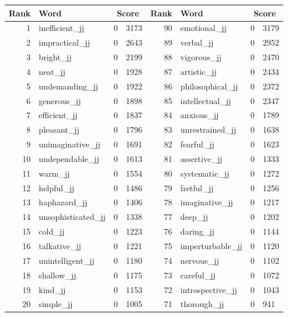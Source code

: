 \begin{table}[tbp]
    \begin{tabular}{| rlr@{.}l | rlr@{.}l |}
    \hline
    \textbf{Rank} & \textbf{Word} & \multicolumn{2}{c|}{\textbf{Score}} & \textbf{Rank} & \textbf{Word} & \multicolumn{2}{c|}{\textbf{Score}} \\
    \hline
    1 & inefficient\_jj & 0 & 3173    &    90 & emotional\_jj & 0 & 3179 \\
    2 & impractical\_jj & 0 & 2643    &    89 & verbal\_jj & 0 & 2952 \\
    3 & bright\_jj & 0 & 2199    &    88 & vigorous\_jj & 0 & 2470 \\
    4 & neat\_jj & 0 & 1928    &    87 & artistic\_jj & 0 & 2434 \\
    5 & undemanding\_jj & 0 & 1922    &    86 & philosophical\_jj & 0 & 2372 \\
    6 & generous\_jj & 0 & 1898    &    85 & intellectual\_jj & 0 & 2347 \\
    7 & efficient\_jj & 0 & 1837    &    84 & anxious\_jj & 0 & 1789 \\
    8 & pleasant\_jj & 0 & 1796    &    83 & unrestrained\_jj & 0 & 1638 \\
    9 & unimaginative\_jj & 0 & 1691    &    82 & fearful\_jj & 0 & 1623 \\
    10 & undependable\_jj & 0 & 1613    &    81 & assertive\_jj & 0 & 1333 \\
    11 & warm\_jj & 0 & 1554    &    80 & systematic\_jj & 0 & 1272 \\
    12 & helpful\_jj & 0 & 1486    &    79 & fretful\_jj & 0 & 1256 \\
    13 & haphazard\_jj & 0 & 1406    &    78 & imaginative\_jj & 0 & 1217 \\
    14 & unsophisticated\_jj & 0 & 1338    &    77 & deep\_jj & 0 & 1202 \\
    15 & cold\_jj & 0 & 1223    &    76 & daring\_jj & 0 & 1144 \\
    16 & talkative\_jj & 0 & 1221    &    75 & imperturbable\_jj & 0 & 1120 \\
    17 & unintelligent\_jj & 0 & 1180    &    74 & nervous\_jj & 0 & 1102 \\
    18 & shallow\_jj & 0 & 1175    &    73 & careful\_jj & 0 & 1072 \\
    19 & kind\_jj & 0 & 1153    &    72 & introspective\_jj & 0 & 1043 \\
    20 & simple\_jj & 0 & 1005    &    71 & thorough\_jj & 0 & 941 \\

\end{tabular}
\end{table}
